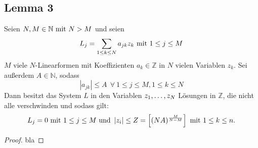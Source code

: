 
\subsection{Lemma 3}
    \label{subsec:lemma3}
    Seien $N, M \in \mathbb{N} \ \textrm{mit}\  N > M$ und seien
    \begin{equation*}
        L_j = \sum_{1 \leq k \leq N} a_{jk} z_k \ \textrm{mit}\  1 \leq j \leq M
    \end{equation*}
    $M$ viele $N$-Linearformen mit Koeffizienten $a_k \in \mathbb{Z}$ in $N$ vielen Variablen $z_k$.
    \textrm{Sei außerdem} $A \in \mathbb{N}$, sodass
    \begin{equation*}
        \left| a_{jk} \right| \leq A \ \ \forall \ 1 \leq j \leq M, 1 \leq k \leq N
    \end{equation*}
    \textrm{Dann besitzt das System $L$ in den Variablen $z_1, \dots, z_N$ Lösungen in $\mathbb{Z}$, die nicht alle
    verschwinden und sodass gilt:}
    \begin{equation*}
        L_j = 0 \ \textrm{mit}\  1 \leq j \leq M \ \textrm{und}\  \left| z_i \right| \leq Z = \left[ (NA)^{\frac{M}{N-M}} \right]
        \ \textrm{mit}\  1 \leq k \leq n.
    \end{equation*}
    \begin{proof}
        bla
    \end{proof}

